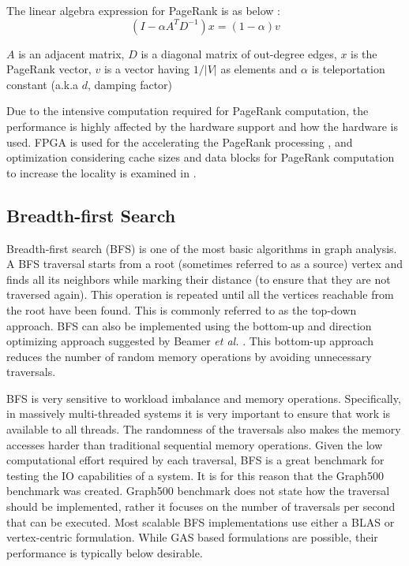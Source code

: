 
The linear algebra expression for PageRank is as below \cite{7529953}:
\begin{equation}
    (I - \alpha A^T D^{-1})x = (1 - \alpha)v
\end{equation}

$A$ is an adjacent matrix, $D$ is a diagonal matrix of out-degree edges, $x$ is the PageRank vector, $v$ is a vector having $1/|V|$ as elements and $\alpha$ is teleportation constant (a.k.a $d$, damping factor)

Due to the intensive computation required for PageRank computation, the performance is highly affected by the hardware support and how the hardware is used. FPGA is used for the accelerating the PageRank processing \cite{zhou2017design}, and optimization considering cache sizes and data blocks for PageRank computation to increase the locality is examined in \cite{7967173}.

\subsection{Breadth-first Search}
\label{subsec:bfs}
Breadth-first search (BFS) is one of the most basic algorithms in graph analysis. A BFS traversal starts from a root (sometimes referred to as a source) vertex and finds all its neighbors while marking their distance (to ensure that they are not traversed again). This operation is repeated until all the vertices reachable from the root have been found. This is commonly referred to as the top-down approach.
BFS can also be implemented using the bottom-up and direction optimizing approach suggested by Beamer \emph{et al.} \cite{beamer2012direction}. This bottom-up approach reduces the number of random memory operations by avoiding unnecessary traversals. 


BFS is very sensitive to workload imbalance and memory operations. Specifically, in massively multi-threaded systems it is very important to ensure that work is available to all threads. The randomness of the traversals also makes the memory accesses harder than traditional sequential memory operations. Given the low computational effort required by each traversal, BFS is a great benchmark for testing the IO capabilities of a system. It is for this reason that the Graph500 \cite{graph500} benchmark was created. Graph500 benchmark does not state how the traversal should be implemented, rather it focuses on the number of traversals per second that can be executed. Most scalable BFS implementations use either a BLAS or vertex-centric formulation. While GAS based formulations are possible, their performance is typically below desirable. 


